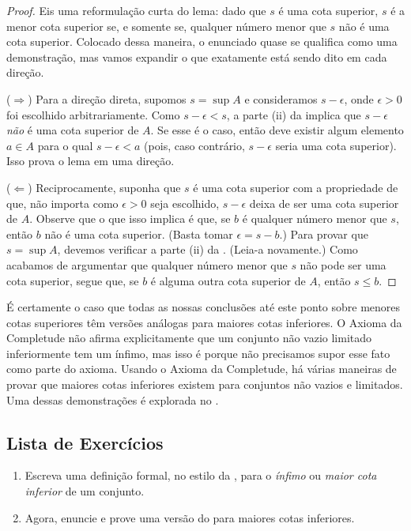 \begin{proof}
Eis uma reformulação curta do lema: dado que $s$ é uma cota superior, $s$ é a menor cota superior se, e somente se, qualquer número menor que $s$ não é uma cota superior. Colocado dessa maneira, o enunciado quase se qualifica como uma demonstração, mas vamos expandir o que exatamente está sendo dito em cada direção.

($\Rightarrow$) Para a direção direta, supomos $s = \sup A$ e consideramos $s - \epsilon$, onde $\epsilon > 0$ foi escolhido arbitrariamente. Como $s - \epsilon < s$, a parte (ii) da  implica que $s - \epsilon$ \textit{não} é uma cota superior de $A$. Se esse é o caso, então deve existir algum elemento $a \in A$ para o qual $s - \epsilon < a$ (pois, caso contrário, $s - \epsilon$ seria uma cota superior). Isso prova o lema em uma direção.

($\Leftarrow$) Reciprocamente, suponha que $s$ é uma cota superior com a propriedade de que, não importa como $\epsilon > 0$ seja escolhido, $s - \epsilon$ deixa de ser uma cota superior de $A$. Observe que o que isso implica é que, se $b$ é qualquer número menor que $s$, então $b$ não é uma cota superior. (Basta tomar $\epsilon = s - b$.) Para provar que $s = \sup A$, devemos verificar a parte (ii) da . (Leia-a novamente.) Como acabamos de argumentar que qualquer número menor que $s$ não pode ser uma cota superior, segue que, se $b$ é alguma outra cota superior de $A$, então $s \leq b$.
\end{proof}

É certamente o caso que todas as nossas conclusões até este ponto sobre menores cotas superiores têm versões análogas para maiores cotas inferiores. O Axioma da Completude não afirma explicitamente que um conjunto não vazio limitado inferiormente tem um ínfimo, mas isso é porque não precisamos supor esse fato como parte do axioma. Usando o Axioma da Completude, há várias maneiras de provar que maiores cotas inferiores existem para conjuntos não vazios e limitados. Uma dessas demonstrações é explorada no .

\subsection{Lista de Exercícios}\label{subsec:exercicios-completude}

\begin{exercise}\label{ex:definicao-infimo}
\begin{enumerate}[label=\alph*)]
\item Escreva uma definição formal, no estilo da , para o \textit{ínfimo} ou \textit{maior cota inferior} de um conjunto.
\item Agora, enuncie e prove uma versão do  para maiores cotas inferiores.
\end{enumerate}
\end{exercise}

